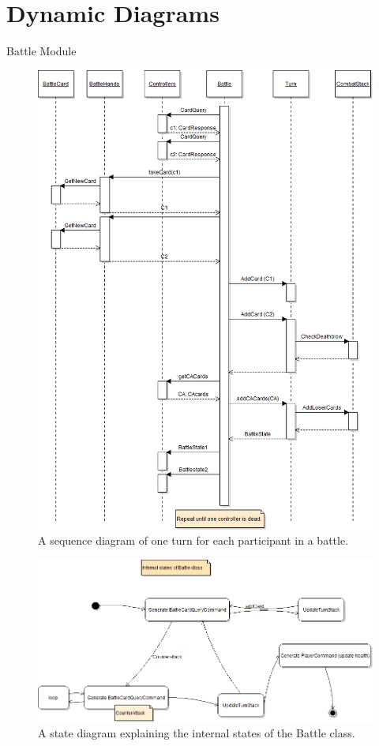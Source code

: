 \section{Dynamic Diagrams}
\label{sec:dynamics}
Battle Module
\begin{figure}[h]
\center
\includegraphics{diagrams/BattleSequenceDiagram.png}
\caption{A sequence diagram of one turn for each participant in a battle.}
\label{fig:battle_sequence_diagram}
\end{figure}

\begin{figure}[h]
\center
\includegraphics{diagrams/BattleStateDiagram.png}
\caption{A state diagram explaining the internal states of the Battle class.}
\label{fig:battle_state_diagram}
\end{figure}


